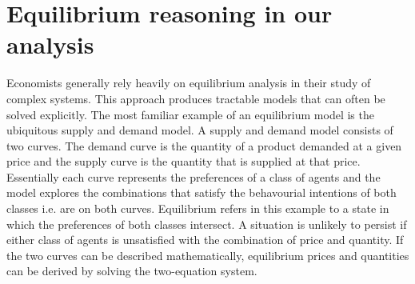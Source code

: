 





\section{Equilibrium reasoning in our analysis}
Economists generally rely heavily on equilibrium analysis in their study of complex systems. 
This approach produces tractable models that can often be solved explicitly. The most familiar example of an equilibrium model is the ubiquitous supply and demand model. A supply and demand model consists of two curves. The demand curve is the quantity of a product demanded at a given price and the supply curve is the quantity that is supplied at that price. Essentially each curve represents the preferences of a class of agents and the model explores the combinations that satisfy the behavourial intentions of both classes i.e. are on both curves. Equilibrium refers in this example to a state in which the preferences of both classes intersect. A situation is unlikely to persist if either class of agents is unsatisfied with the combination of price and quantity.  If the two curves can be described mathematically, equilibrium prices and quantities can be derived by solving the two-equation system.

